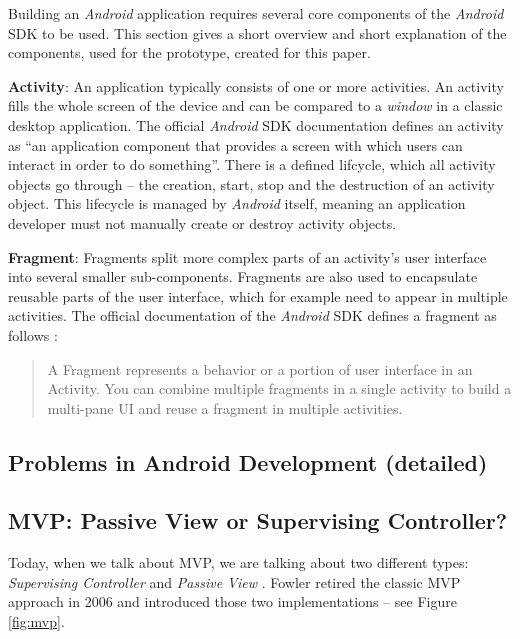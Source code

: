 Building an \emph{Android} application requires several core components of the \emph{Android} SDK to be used. This section gives a short overview and short explanation of the components, used for the prototype, created for this paper.

\textbf{Activity}: An application typically consists of one or more activities. An activity fills the whole screen of the device and can be compared to a \emph{window} in a classic desktop application. The official \emph{Android} SDK documentation \cite{SDKActivities} defines an activity as \enquote{an application component that provides a screen with which users can interact in order to do something}.
There is a defined lifcycle, which all activity objects go through -- the creation, start, stop and the destruction of an activity object. This lifecycle is managed by \emph{Android} itself, meaning an application developer must not manually create or destroy activity objects.

\textbf{Fragment}: Fragments split more complex parts of an activity's user interface into several smaller sub-components. Fragments are also used to encapsulate reusable parts of the user interface, which for example need to appear in multiple activities. The official documentation of the \emph{Android} SDK defines a fragment as follows \cite{SDKFragments}:

\begin{quote}
A Fragment represents a behavior or a portion of user interface in an Activity. You can combine multiple fragments in a single activity to build a multi-pane UI and reuse a fragment in multiple activities.
\end{quote}

\subsection{Problems in Android Development (detailed)}

\subsection{MVP: Passive View or Supervising Controller?}

Today, when we talk about MVP, we are talking about two different types: \emph{Supervising Controller} \cite{FowlerSupervisingController} and \emph{Passive View} \cite{FowlerPassiveView}. Fowler retired the classic MVP approach in 2006 \cite{FowlerMvpRetirementNote} and introduced those two implementations -- see Figure \ref{fig:mvp}.

